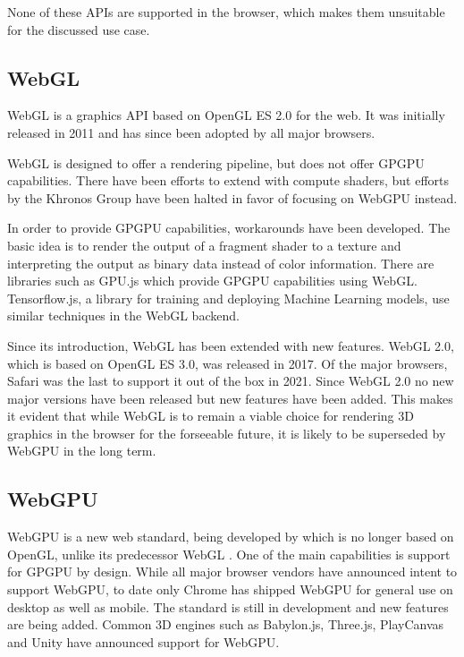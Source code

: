 None of these \glspl{API} are supported in the browser, which makes them unsuitable for the discussed use case.

\subsection{WebGL}

\gls{WebGL} is a graphics \gls{API} based on \gls{OpenGL ES} 2.0 for the web. It was initially released in 2011 and has since been adopted by all major browsers.

\gls{WebGL} is designed to offer a rendering pipeline, but does not offer \gls{GPGPU} capabilities. There have been efforts to extend with compute shaders, but efforts by the \gls{Khronos Group} have been halted in favor of focusing on WebGPU instead.

In order to provide \gls{GPGPU} capabilities, workarounds have been developed. The basic idea is to render the output of a fragment shader to a texture and interpreting the output as binary data instead of color information.
There are libraries such as GPU.js which provide \gls{GPGPU} capabilities using \gls{WebGL}. Tensorflow.js, a library for training and deploying Machine Learning models, use similar techniques in the \gls{WebGL} backend.

Since its introduction, \gls{WebGL} has been extended with new features. \gls{WebGL} 2.0, which is based on \gls{OpenGL ES} 3.0, was released in 2017. Of the major browsers, Safari was the last to support it out of the box in 2021. Since \gls{WebGL} 2.0 no new major versions have been released but new features have been added. This makes it evident that while \gls{WebGL} is to remain a viable choice for rendering 3D graphics in the browser for the forseeable future, it is likely to be superseded by WebGPU in the long term.

\subsection{WebGPU}

WebGPU is a new web standard, being developed by  which is no longer based on \gls{OpenGL}, unlike its predecessor \gls{WebGL} \cite{webgpuSpecification}. One of the main capabilities is support for \gls{GPGPU} by design. While all major browser vendors have announced intent to support WebGPU, to date only Chrome has shipped WebGPU for general use on desktop as well as mobile.
The standard is still in development and new features are being added.
Common 3D engines such as \gls{Babylon.js}, \gls{Three.js}, \gls{PlayCanvas} and \gls{Unity} have announced support for WebGPU.

